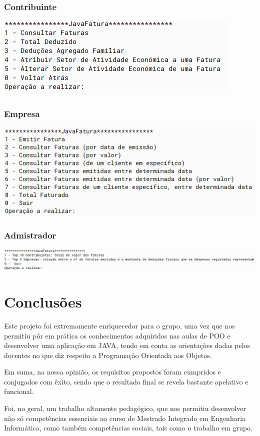 \documentclass[a4paper]{article}
\begin{document}
\subsubsection{Contribuinte}

	\includegraphics[width=.7\linewidth]{contribuinte_menu.png}


\subsubsection{Empresa}

	\includegraphics[width=.9\linewidth]{empresa_menu.png}


\subsubsection{Admistrador}

	\includegraphics[width=.9\linewidth]{admin_menu.png}




\section{Conclusões}
\label{sec:conclusao}

Este projeto foi extremamente enriquecedor para o grupo, uma vez que nos permitiu pôr em prática os conhecimentos adquiridos nas aulas de POO e desenvolver uma aplicação em JAVA, tendo em conta as orientações dadas pelos docentes no que diz respeito a Programação Orientada aos Objetos. 

Em suma, na nossa opinião, os requisitos propostos foram cumpridos e conjugados com êxito, sendo que o resultado final se revela bastante apelativo e funcional.

Foi, no geral, um trabalho  altamente pedagógico, que nos permitiu desenvolver não só competências essenciais ao curso de Mestrado Integrado em Engenharia Informática, como também competências sociais, tais como o trabalho em grupo.
\end{document}
